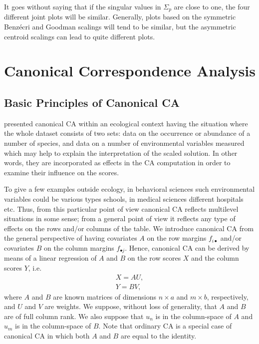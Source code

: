 \documentclass[article]{Z}
\begin{document}
It goes without saying that if the singular values in $\Sigma_p$ are close to one, the four different joint
plots will be similar. Generally, plots based on the symmetric Benz\'ecri and Goodman scalings will tend to be similar, but the asymmetric centroid scalings can lead to quite different plots.


\section{Canonical Correspondence Analysis}
\label{sec:cca}
\subsection{Basic Principles of Canonical CA}
\citet{TerBraak:86} presented canonical CA within an ecological context having the situation where the whole dataset consists of two sets: data on the occurrence or abundance of a number of species, and data on a number of environmental variables measured which may help to explain the interpretation of the scaled solution. In other words, they are incorporated as effects in the CA computation in order to examine their influence on the scores. 

To give a few examples outside ecology, in behavioral sciences such environmental variables could be various types schools, in medical sciences different hospitals etc. Thus, from this particular point of view canonical CA reflects multilevel situations in some sense; from a general point of view it reflects any type of effects on the rows and/or columns of the table.
We introduce canonical CA from the general perspective of having covariates $A$ on the row margins $f_{i\bullet}$ and/or covariates $B$ on the column margins $f_{\bullet j}$. Hence, canonical CA can be derived by means of a linear regression of $A$ and $B$ on the row scores $X$ and the column scores $Y$, i.e.
\begin{subequations}
\label{eq:lc}
\begin{align}
X=AU,\\ 
Y=BV, 
\end{align}
\end{subequations}
where \(A\) and \(B\) are known matrices of dimensions \(n\times a\) and \(m\times b\), respectively, and $U$ and $V$ are weights. We suppose, without loss of generality, that \(A\) and \(B\) are of full column rank. We also
suppose that \(u_n\) is in the column-space of \(A\) and \(u_m\) is in the
column-space of \(B\). Note that ordinary CA is a special case of canonical CA in
which both \(A\) and \(B\) are equal to the identity.
\end{document}
